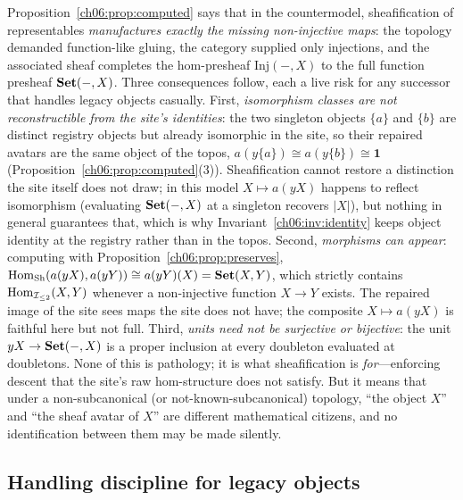 \begin{remark}\label{ch06:rem:reading}
Proposition~\ref{ch06:prop:computed} says that in the countermodel,
sheafification of representables \emph{manufactures exactly the missing
non-injective maps}: the topology demanded function-like gluing, the
category supplied only injections, and the associated sheaf completes the
hom-presheaf $\mathrm{Inj}(-,X)$ to the full function presheaf
$\mathbf{Set}(-,X)$. Three consequences follow, each a live risk for any successor
that handles legacy objects casually.
First, \emph{isomorphism classes are not reconstructible from the site's
identities}: the two singleton objects $\{a\}$ and $\{b\}$ are distinct
registry objects but already isomorphic in the site, so their repaired
avatars are the same object of the topos, $a(y\{a\})\cong
a(y\{b\})\cong\mathbf{1}$
(Proposition~\ref{ch06:prop:computed}(3)). Sheafification cannot restore a
distinction the site itself does not draw; in this model $X\mapsto a(yX)$
happens to reflect isomorphism (evaluating $\mathbf{Set}(-,X)$ at a singleton
recovers $|X|$), but nothing in general guarantees that, which is why
Invariant~\ref{ch06:inv:identity} keeps object identity at the registry
rather than in the topos. Second, \emph{morphisms can appear}: computing with
Proposition~\ref{ch06:prop:preserves},
$\mathrm{Hom}_{\mathrm{Sh}}(a(yX),a(yY))\cong a(yY)(X)=\mathbf{Set}(X,Y)$, which strictly contains
$\mathrm{Hom}_{\mathcal{I}_{\le 2}}(X,Y)$ whenever a non-injective function
$X\to Y$ exists. The repaired image of the site sees maps the site does not
have; the composite $X\mapsto a(yX)$ is faithful here but not full. Third,
\emph{units need not be surjective or bijective}: the unit
$yX\to\mathbf{Set}(-,X)$ is a proper inclusion at every doubleton evaluated at
doubletons. None of this is pathology; it is what sheafification is
\emph{for}---enforcing descent that the site's raw hom-structure does not
satisfy. But it means that under a non-subcanonical (or
not-known-subcanonical) topology, ``the object $X$'' and ``the sheaf
avatar of $X$'' are different mathematical citizens, and no identification
between them may be made silently.
\end{remark}

\subsection{Handling discipline for legacy objects}
\label{ch06:sec:discipline}


